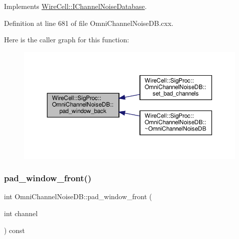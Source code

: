Implements \hyperlink{class_wire_cell_1_1_i_channel_noise_database_a4d772c3ba5f7071a2d869264f37dfecc}{Wire\+Cell\+::\+I\+Channel\+Noise\+Database}.



Definition at line 681 of file Omni\+Channel\+Noise\+D\+B.\+cxx.

Here is the caller graph for this function\+:
\nopagebreak
\begin{figure}[H]
\begin{center}
\leavevmode
\includegraphics[width=350pt]{class_wire_cell_1_1_sig_proc_1_1_omni_channel_noise_d_b_ac765001725b5a181ccfd605d0221e0ef_icgraph}
\end{center}
\end{figure}
\mbox{\label{class_wire_cell_1_1_sig_proc_1_1_omni_channel_noise_d_b_afc69ca596a5ff6f8a63fc64234c8062e}} 
\subsubsection{\texorpdfstring{pad\+\_\+window\+\_\+front()}{pad\_window\_front()}}
{\footnotesize\ttfamily int Omni\+Channel\+Noise\+D\+B\+::pad\+\_\+window\+\_\+front (\begin{DoxyParamCaption}\item[{int}]{channel }\end{DoxyParamCaption}) const\hspace{0.3cm}{\ttfamily [virtual]}}




